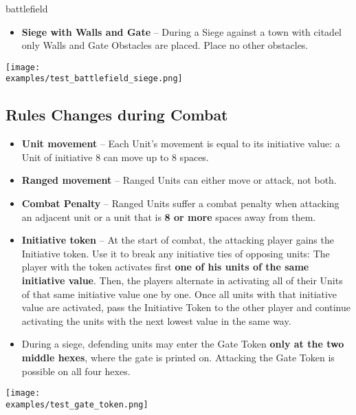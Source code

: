 \newpage
\begin{expansion}{battlefield}
  \begin{multicols*}{2}
  \begin{itemize}
  	\item \textbf{Siege with Walls and Gate} – During a Siege against a town with citadel only Walls and Gate Obstacles are placed. Place no other obstacles. 
  \end{itemize}
  \texttt{[image: \\examples/test\_battlefield\_siege.png]}
  \subsection*{Rules Changes during Combat}
  \begin{itemize}
  	\item \textbf{Unit movement} – Each Unit's movement is equal to its initiative value: a Unit of initiative 8 can move up to 8 spaces.
  	\item \textbf{Ranged movement}  – Ranged  Units can either move or attack, not both.
    \columnbreak
  	\item \textbf{Combat Penalty} – Ranged  Units suffer a combat penalty when attacking an adjacent unit or a unit that is \textbf{8 or more} spaces away from them.
  	\item \textbf{Initiative token} – At the start of combat, the attacking player gains the Initiative token. 
  	Use it to break any initiative ties of opposing units: The player with the token activates first \textbf{one of his units of the same initiative value}.
  	Then, the players alternate in activating all of their Units of that same initiative value one by one.
  	Once all units with that initiative value are activated, pass the Initiative Token to the other player and continue activating the units with the next lowest value in the same way.
  	\item During a siege, defending units may enter the Gate Token \textbf{only at the two middle hexes}, where the gate is printed on. Attacking the Gate Token is possible on all four hexes.
  \end{itemize}
  \texttt{[image: \\examples/test\_gate\_token.png]}
  \end{multicols*}
\end{expansion}

